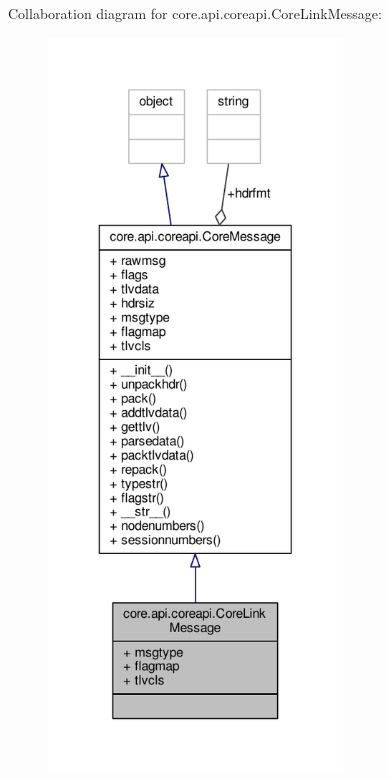 Collaboration diagram for core.\+api.\+coreapi.\+Core\+Link\+Message\+:
\nopagebreak
\begin{figure}[H]
\begin{center}
\leavevmode
\includegraphics[height=550pt]{classcore_1_1api_1_1coreapi_1_1_core_link_message__coll__graph}
\end{center}
\end{figure}
